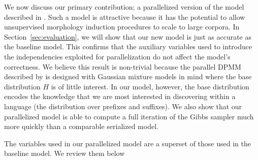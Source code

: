 We now discuss our primary contribution; a parallelized version of the
model described in \cite{goldwater2011}. Such a model is attractive
because it has the potential to allow unsupervised morphology
induction procedures to scale to large corpora. In
Section~\ref{sec:evaluation}, we will show that our new model is just
as accurate as the baseline model. This confirms that the auxiliary
variables used to introduce the independencies exploited for
parallelization do not affect the model's correctness. We believe this
result is non-trivial because the parallel DPMM described by
\cite{williamson2013} is designed with Gaussian mixture models in mind
where the base distribution $H$ is of little interest. In our model,
however, the base distribution encodes the knowledge that we are most
interested in discovering within a language (the distribution over
prefixes and suffixes). We also show that our parallelized model is
able to compute a full iteration of the Gibbs sampler much more
quickly than a comparable serialized model.

The variables used in our parallelized model are a superset of those
used in the baseline model. We review them below

